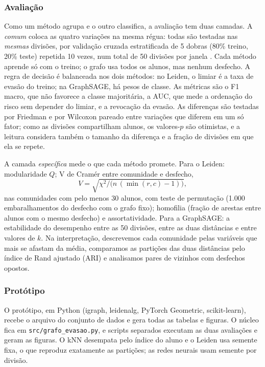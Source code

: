 \subsubsection{Avaliação}

Como um método agrupa e o outro classifica, a avaliação tem duas camadas. A \textit{comum} coloca as quatro variações na mesma régua: todas são testadas nas \textit{mesmas} divisões, por validação cruzada estratificada de 5 dobras (80\% treino, 20\% teste) repetida 10 vezes, num total de 50 divisões por janela \citep{shchur2018}. Cada método aprende só com o treino; o grafo usa todos os alunos, mas nenhum desfecho. A regra de decisão é balanceada nos dois métodos: no Leiden, o limiar é a taxa de evasão do treino; na GraphSAGE, há pesos de classe. As métricas são o F1 macro, que não favorece a classe majoritária, a AUC, que mede a ordenação do risco sem depender do limiar, e a revocação da evasão. As diferenças são testadas por Friedman e por Wilcoxon pareado entre variações que diferem em um só fator; como as divisões compartilham alunos, os valores-$p$ são otimistas, e a leitura considera também o tamanho da diferença e a fração de divisões em que ela se repete.

A camada \textit{específica} mede o que cada método promete. Para o Leiden: modularidade $Q$; V de Cramér entre comunidade e desfecho,
\begin{equation}
V = \sqrt{\chi^2 / \big(n\,(\min(r,c) - 1)\big)},
\label{eq-cramer}
\end{equation}
nas comunidades com pelo menos 30 alunos, com teste de permutação (1.000 embaralhamentos do desfecho com o grafo fixo); homofilia (fração de arestas entre alunos com o mesmo desfecho) e assortatividade. Para a GraphSAGE: a estabilidade do desempenho entre as 50 divisões, entre as duas distâncias e entre valores de $k$. Na interpretação, descrevemos cada comunidade pelas variáveis que mais se afastam da média, comparamos as partições das duas distâncias pelo índice de Rand ajustado (ARI) e analisamos pares de vizinhos com desfechos opostos.

\subsubsection{Protótipo}

O protótipo, em Python (igraph, leidenalg, PyTorch Geometric, scikit-learn), recebe o arquivo do conjunto de dados e gera todas as tabelas e figuras. O núcleo fica em \texttt{src/grafo\_evasao.py}, e scripts separados executam as duas avaliações e geram as figuras. O kNN desempata pelo índice do aluno e o Leiden usa semente fixa, o que reproduz exatamente as partições; as redes neurais usam semente por divisão.
